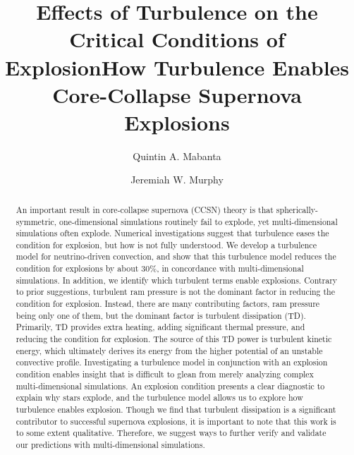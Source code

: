 \documentclass[twocolumn]{aastex6}
\begin{document}
\title{Effects of Turbulence on the Critical Conditions of Explosion}
\title{How Turbulence Enables Core-Collapse Supernova Explosions}


\author{Quintin A. Mabanta}
\author{Jeremiah W. Murphy}


\begin{abstract}
An important result in core-collapse supernova (CCSN) theory
  is that spherically-symmetric,
one-dimensional simulations routinely fail to explode, yet multi-dimensional simulations
  often explode. Numerical
investigations suggest that turbulence
eases the condition for explosion, but how is not fully
  understood. We develop a turbulence model for neutrino-driven
  convection, and show that this turbulence model reduces
  the condition for explosions by about 30\%, in concordance with multi-dimensional simulations.
 In addition, we identify which turbulent
  terms enable explosions.  Contrary to
    prior suggestions, turbulent ram pressure is not the dominant factor in reducing the condition for explosion.
Instead, there are many contributing factors,
  ram pressure being only one of them, but the dominant factor is
turbulent dissipation (TD).   Primarily, TD provides extra heating,
adding significant thermal pressure, and reducing the condition for explosion.  The source of
this TD power is turbulent kinetic energy,
which ultimately derives its energy from the higher
potential of an unstable convective profile. Investigating a turbulence model in conjunction
  with an explosion condition enables insight that is difficult to
  glean from merely analyzing complex multi-dimensional simulations. An explosion
  condition presents a clear diagnostic to explain why stars explode, and the turbulence
  model allows us to explore how turbulence enables explosion. Though
  we find that turbulent dissipation is
a significant contributor to successful supernova explosions,
it is important to note that this work is to some extent qualitative.
Therefore, we suggest ways to further verify and validate our
  predictions with multi-dimensional simulations.
\end{abstract}
\end{document}
